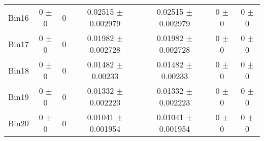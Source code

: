 \begin{tabular}{@{\extracolsep{4pt}}lcccccc@{}}
     Bin16 & 0 $\pm$ 0 & 0 & 0.02515 $\pm$ 0.002979 & 0.02515 $\pm$ 0.002979 & 0 $\pm$ 0 & 0 $\pm$ 0 \\ 
     Bin17 & 0 $\pm$ 0 & 0 & 0.01982 $\pm$ 0.002728 & 0.01982 $\pm$ 0.002728 & 0 $\pm$ 0 & 0 $\pm$ 0 \\ 
     Bin18 & 0 $\pm$ 0 & 0 & 0.01482 $\pm$ 0.00233 & 0.01482 $\pm$ 0.00233 & 0 $\pm$ 0 & 0 $\pm$ 0 \\ 
     Bin19 & 0 $\pm$ 0 & 0 & 0.01332 $\pm$ 0.002223 & 0.01332 $\pm$ 0.002223 & 0 $\pm$ 0 & 0 $\pm$ 0 \\ 
     Bin20 & 0 $\pm$ 0 & 0 & 0.01041 $\pm$ 0.001954 & 0.01041 $\pm$ 0.001954 & 0 $\pm$ 0 & 0 $\pm$ 0 \\ 
\hline\hline
  \end{tabular}
